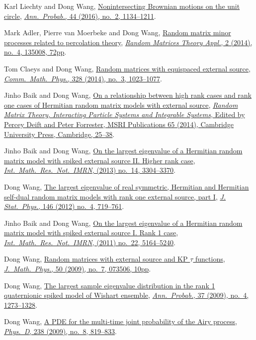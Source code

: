 \begin{etaremune}
\item
  Karl Liechty and Dong Wang, \href{http://arxiv.org/abs/1312.7390}{Nonintersecting Brownian motions on the unit circle}, \href{https://doi.org/10.1214/14-AOP998}{\textit{Ann.\ Probab.}, 44 (2016), no.\ 2, 1134--1211}.
\item 
  Mark Adler, Pierre van Moerbeke and Dong Wang,
  \href{http://arxiv.org/abs/1301.7017}{Random matrix minor processes related to percolation theory}, \href{https://doi.org/10.1142/S2010326313500081}{\textit{Random Matrices Theory Appl.}, 2 (2014), no.\ 4, 135008, 72pp}.
\item 
  Tom Claeys and Dong Wang,
  \href{http://arxiv.org/abs/1212.3768}{Random matrices with equispaced external source}, \href{https://doi.org/10.1007/s00220-014-1988-y}{\textit{Comm.\ Math.\ Phys.}, 328 (2014), no.\ 3, 1023--1077}.
\item Jinho Baik and Dong Wang,
  \href{http://arxiv.org/abs/1207.0389}{On a relationship between high rank cases and rank one cases of Hermitian random matrix models with external source}, \href{http://www.cambridge.org/asia/catalogue/catalogue.asp?isbn=9781107079922}{\textit{Random Matrix Theory, Interacting Particle Systems and Integrable Systems}, Edited by Percey Deift and Peter Forrester, MSRI Publications 65 (2014), Cambridge University Press, Cambridge, 25--38}.
\item Jinho Baik and Dong Wang,
  \href{http://arxiv.org/abs/1104.2915}{On the largest eigenvalue of a Hermitian random matrix model with spiked external source II. Higher rank case}, \href{https://doi.org/10.1093/imrn/rns136}{\textit{Int.\ Math.\ Res.\ Not.\ IMRN}, (2013) no.\ 14, 3304--3370}.
\item Dong Wang,
  \href{http://arxiv.org/abs/1012.4144}{The largest eigenvalue of real symmetric, Hermitian and Hermitian self-dual random matrix models with rank one external source, part I}, \href{https://doi.org/10.1007/s10955-012-0417-x}{\textit{J. Stat.\ Phys.}, 146 (2012) no.\ 4, 719--761}.
\item Jinho Baik and  Dong Wang,
  \href{http://arxiv.org/abs/1010.4604}{On the largest eigenvalue of a Hermitian random matrix model with spiked external source I. Rank 1 case}, \href{https://doi.org/10.1093/imrn/rnq257}{\textit{Int.\ Math.\ Res.\ Not.\ IMRN}, (2011) no.\ 22, 5164--5240}.
\item Dong Wang,
  \href{http://arxiv.org/abs/0810.0280}{Random matrices with external source and KP $\tau$ functions}, \href{https://doi.org/10.1063/1.3167802}{\textit{J.\ Math.\ Phys.}, 50 (2009), no.\ 7, 073506, 10pp}.
\item Dong Wang,
 \href{http://arxiv.org/abs/0711.2722}{The largest sample eigenvalue distribution in the rank 1 quaternionic spiked model of Wishart ensemble}, \href{https://doi.org/10.1214/08-AOP432}{\textit{Ann.\ Probab.}, 37 (2009), no.\ 4, 1273--1328}.
\item Dong Wang,
  \href{http://arxiv.org/abs/0711.3797}{A PDE for the multi-time joint probability of the Airy process}, \href{https://doi.org/10.1016/j.physd.2009.02.007}{\textit{Phys.\ D}, 238 (2009), no.\ 8, 819--833}.
\end{etaremune}


